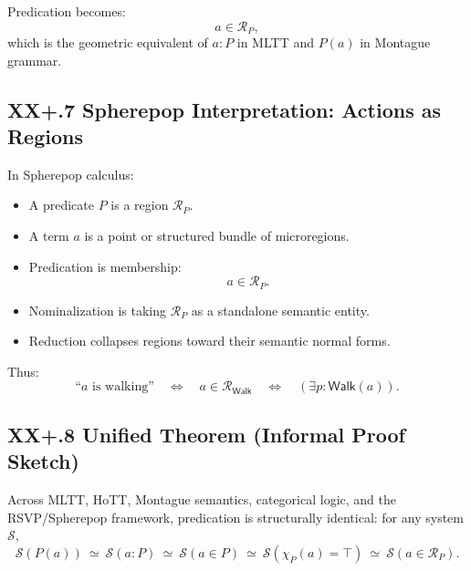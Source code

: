 \documentclass[12pt,letterpaper]{article}
\begin{document}
Predication becomes:
\[
a \in \mathcal{R}_P,
\]
which is the geometric equivalent of $a : P$ in MLTT and $P(a)$ in Montague
grammar.

\subsection{XX+.7 Spherepop Interpretation: Actions as Regions}

In Spherepop calculus:

\begin{itemize}
    \item A predicate $P$ is a region $\mathcal{R}_P$.
    \item A term $a$ is a point or structured bundle of microregions.
    \item Predication is membership:
    \[
    a \in \mathcal{R}_P.
    \]
    \item Nominalization is taking $\mathcal{R}_P$ as a standalone semantic
    entity.
    \item Reduction collapses regions toward their semantic normal forms.
\end{itemize}

Thus:
\[
\text{``$a$ is walking''} 
\quad\Longleftrightarrow\quad
a \in \mathcal{R}_{\mathsf{Walk}}
\quad\Longleftrightarrow\quad
(\exists p : \mathsf{Walk}(a)).
\]

\subsection{XX+.8 Unified Theorem (Informal Proof Sketch)}

\begin{theorem}
Across MLTT, HoTT, Montague semantics, categorical logic, and the RSVP/Spherepop
framework, predication is structurally identical: for any system $\mathcal{S}$,
\[
\mathcal{S}(P(a)) 
\ \simeq\ 
\mathcal{S}(a : P)
\ \simeq\
\mathcal{S}(a \in P)
\ \simeq\
\mathcal{S}(\chi_P(a) = \top)
\ \simeq\
\mathcal{S}(a \in \mathcal{R}_P).
\]
\end{theorem}
\end{document}
